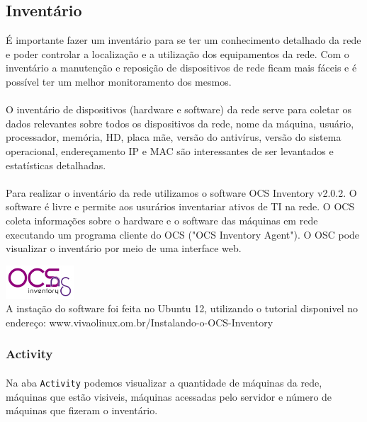 \documentclass[a4paper]{article}
\begin{document}
    \subsection{Inventário}
     É importante fazer um inventário para se ter um conhecimento detalhado da rede e poder controlar a localização e a utilização dos equipamentos da rede. Com o inventário a manutenção e reposição de dispositivos de rede ficam mais fáceis e é possível ter um melhor monitoramento dos mesmos.
	 \paragraph{}
	O inventário de dispositivos (hardware e software) da rede serve para coletar os dados relevantes sobre todos os dispositivos da rede,  nome da máquina, usuário, processador, memória, HD, placa mãe, versão do antivírus, versão do sistema operacional, endereçamento IP e MAC são interessantes de ser levantados e estatísticas detalhadas.
	\paragraph{}
    Para realizar o inventário da rede utilizamos o software OCS Inventory v2.0.2. O software é livre e permite aos usurários inventariar ativos de TI na rede. O OCS coleta informações sobre o hardware e o software das máquinas em rede executando um programa cliente do OCS ("OCS Inventory Agent"). O OSC pode visualizar o inventário por meio de uma interface web.\\
    \begin{center}
     \includegraphics[scale = 0.9]{ocs.png}\\
     A instação do software foi feita no Ubuntu 12, utilizando o tutorial disponivel no endereço: www.vivaolinux.om.br/Instalando-o-OCS-Inventory
    \end{center}
  	\subsubsection{Activity}
    \paragraph{}
    Na aba \texttt{Activity} podemos visualizar a quantidade de máquinas da rede, máquinas que estão visiveis, máquinas acessadas pelo servidor e número de máquinas que fizeram o inventário.\\
   
\end{document}
